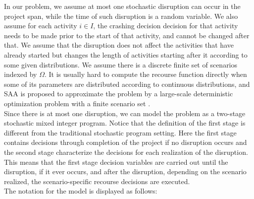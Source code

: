 \documentclass[11pt]{article}
\begin{document}
	\newline
	In our problem, we assume at most one stochastic disruption can occur in the project span, while the time of such disruption is a random variable. We also assume for each activity \(i \in I\), the crashing decision decision for that activity needs to be made prior to the start of that activity, and cannot be changed after that. We assume that the disruption does not affect the activities that have already started but changes the length of activities starting after it according to some given distributions. We assume there is a discrete finite set of scenarios indexed by \(\Omega\). It is usually hard to compute the recourse function directly when some of its parameters are distributed according to continuous distributions, and SAA is proposed to approximate the problem by a large-scale deterministic optimization problem with a finite scenario set \cite{kim2015guide,shapiro2009lectures}. \\
	\newline
	Since there is at most one disruption, we can model the problem as a two-stage stochastic mixed integer program. Notice that the definition of the first stage is different from the traditional stochastic program setting. Here the first stage contains decisions through completion of the project if no disruption occurs and the second stage characterize the decisions for each realization of the disruption. This means that the first stage decision variables are carried out until the disruption, if it ever occurs, and after the disruption, depending on the scenario realized, the scenario-specific recourse decisions are executed.\\
	\newline
	The notation for the model is displayed as follows:
\end{document}
